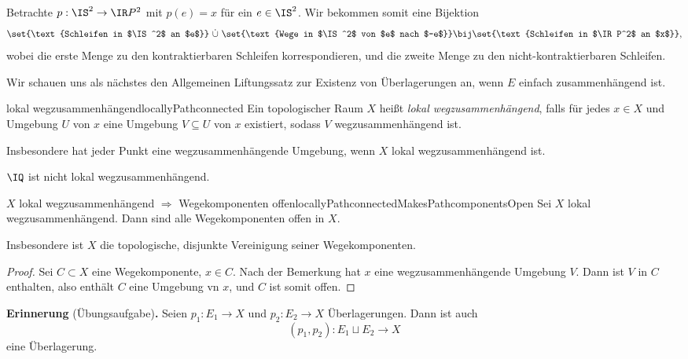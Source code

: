 \documentclass[language=ngerman]{TemplateLecture} %
\begin{document}
\begin{example}
    Betrachte $p: \IS^2 \to \IR P^2$ mit $p(e) = x$ für ein $e \in \IS^2$. Wir bekommen somit eine Bijektion 
    \begin{equation*}
        \set{\text{Schleifen in $\IS^2$ an $e$}} ~\dot{\cup}~ \set{\text{Wege in $\IS^2$ von $e$ nach $-e$}} \bij \set{\text{Schleifen in $\IR P^2$ an $x$}},
    \end{equation*}
    wobei die erste Menge zu den kontraktierbaren Schleifen korrespondieren, und die zweite Menge zu den nicht-kontraktierbaren Schleifen.
\end{example}

Wir schauen uns als nächstes den Allgemeinen Liftungssatz zur Existenz von Überlagerungen an, wenn $E$ einfach zusammenhängend ist.

\begin{defi}{lokal wegzusammenhängend}{locallyPathconnected}
    Ein topologischer Raum $X$ heißt \emph{lokal wegzusammenhängend}, falls für jedes $x \in X$ und Umgebung $U$ von $x$ eine Umgebung $V \subseteq U$ von $x$ existiert, sodass $V$ wegzusammenhängend ist.
\end{defi}
\begin{remark}
    Insbesondere hat jeder Punkt eine wegzusammenhängende Umgebung, wenn $X$ lokal wegzusammenhängend ist.
\end{remark}

\begin{example}
    $\IQ$ ist nicht lokal wegzusammenhängend.
\end{example}

\begin{thm}{$X$ lokal wegzusammenhängend $\Rightarrow$ Wegekomponenten offen}{locallyPathconnectedMakesPathcomponentsOpen}
    Sei $X$ lokal wegzusammenhängend. Dann sind alle Wegekomponenten offen in $X$.

    Insbesondere ist $X$ die topologische, disjunkte Vereinigung seiner Wegekomponenten.
\end{thm}
\begin{proof}
    Sei $C \subset X$ eine Wegekomponente, $x \in C$. Nach der Bemerkung hat $x$ eine wegzusammenhängende Umgebung $V$. Dann ist $V$ in $C$ enthalten, also enthält $C$ eine Umgebung vn $x$, und $C$ ist somit offen.
\end{proof}

\textbf{Erinnerung} (Übungsaufgabe)\textbf{.} Seien $p_1: E_1 \to X$ und $p_2: E_2 \to X$ Überlagerungen. Dann ist auch 
\begin{equation*}
    (p_1, p_2): E_1 \sqcup E_2 \to X
\end{equation*}
eine Überlagerung.
\end{document}
